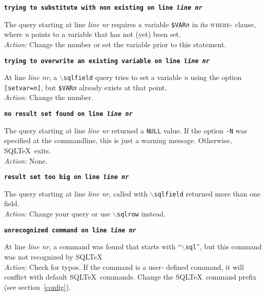 \documentclass{article}
\newcommand{\bs}{\begin{math}\backslash\end{math}}
\newcommand{\vs}{\vspace{3mm}}
\begin{document}
\vs

\noindent\textbf{\texttt{trying to substitute with non existing on line \textit{line nr}}}

\vspace{1mm}

\noindent The query starting at line \textit{line nr} requires a variable \texttt{\$VAR\textit{n}} in its
\textsc{where}- clause, where \textit{n} points to a variable that has not (yet) been set. \\
\textit{Action:} Change the number or set the variable prior to this statement.

\vs

\noindent\textbf{\texttt{trying to overwrite an existing variable on line \textit{line nr}}}

\vspace{1mm}

\noindent At line \textit{line nr}, a \texttt{\bs sqlfield} query tries to set a variable \textit{n}
using the option \texttt{[setvar=\textit{n}]}, but \texttt{\$VAR\textit{n}} already
exists at that point. \\
\textit{Action:} Change the number.

\vs

\noindent\textbf{\texttt{no result set found on line \textit{line nr}}}

\vspace{1mm}

\noindent The query starting at line \textit{line nr} returned a \texttt{NULL} value. If the
option \texttt{-N} was specified at the commandline, this is just a warning message.
Otherwise, SQL\TeX\ exits. \\
\textit{Action:} None.

\vs

\noindent\textbf{\texttt{result set too big on line \textit{line nr}}}

\vspace{1mm}

\noindent The query starting at line \textit{line nr}, called with \texttt{\bs sqlfield} returned more than one field. \\
\textit{Action:} Change your query or use \texttt{\bs sqlrow} instead.

\vs

\noindent\textbf{\texttt{unrecognized command on line \textit{line nr}}}

\vspace{1mm}

\noindent At line \textit{line nr}, a command was found that starts with ``\texttt{\bs sql}'',
but this command was not recognized by SQL\TeX\. \\
\textit{Action:} Check for typos. If the command is a user- defined command, it will
conflict with default SQL\TeX\ commands. Change the SQL\TeX\ command prefix (see section~\ref{config}).
\end{document}
